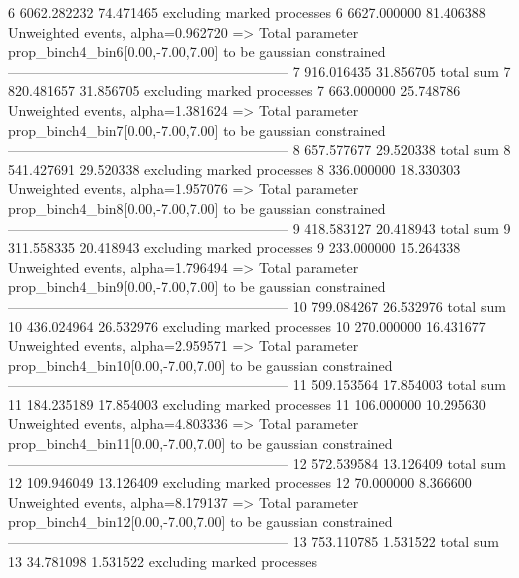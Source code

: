 6          6062.282232     74.471465       excluding marked processes    
6          6627.000000     81.406388       Unweighted events, alpha=0.962720
  => Total parameter prop_binch4_bin6[0.00,-7.00,7.00] to be gaussian constrained
------------------------------------------------------------
7          916.016435      31.856705       total sum                     
7          820.481657      31.856705       excluding marked processes    
7          663.000000      25.748786       Unweighted events, alpha=1.381624
  => Total parameter prop_binch4_bin7[0.00,-7.00,7.00] to be gaussian constrained
------------------------------------------------------------
8          657.577677      29.520338       total sum                     
8          541.427691      29.520338       excluding marked processes    
8          336.000000      18.330303       Unweighted events, alpha=1.957076
  => Total parameter prop_binch4_bin8[0.00,-7.00,7.00] to be gaussian constrained
------------------------------------------------------------
9          418.583127      20.418943       total sum                     
9          311.558335      20.418943       excluding marked processes    
9          233.000000      15.264338       Unweighted events, alpha=1.796494
  => Total parameter prop_binch4_bin9[0.00,-7.00,7.00] to be gaussian constrained
------------------------------------------------------------
10         799.084267      26.532976       total sum                     
10         436.024964      26.532976       excluding marked processes    
10         270.000000      16.431677       Unweighted events, alpha=2.959571
  => Total parameter prop_binch4_bin10[0.00,-7.00,7.00] to be gaussian constrained
------------------------------------------------------------
11         509.153564      17.854003       total sum                     
11         184.235189      17.854003       excluding marked processes    
11         106.000000      10.295630       Unweighted events, alpha=4.803336
  => Total parameter prop_binch4_bin11[0.00,-7.00,7.00] to be gaussian constrained
------------------------------------------------------------
12         572.539584      13.126409       total sum                     
12         109.946049      13.126409       excluding marked processes    
12         70.000000       8.366600        Unweighted events, alpha=8.179137
  => Total parameter prop_binch4_bin12[0.00,-7.00,7.00] to be gaussian constrained
------------------------------------------------------------
13         753.110785      1.531522        total sum                     
13         34.781098       1.531522        excluding marked processes    
